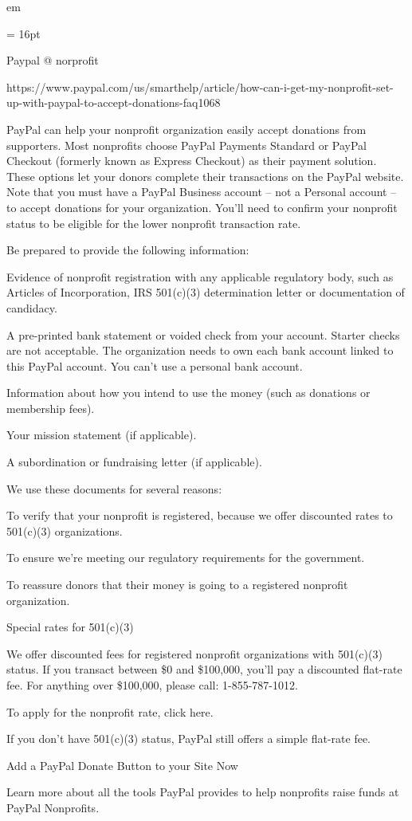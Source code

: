 

 em

\FFrh \baselineskip = 16pt



\centerline{
Paypal @ norprofit
} 
{
https://www.paypal.com/us/smarthelp/article/how-can-i-get-my-nonprofit-set-up-with-paypal-to-accept-donations-faq1068
} 

\par PayPal can help your nonprofit organization easily accept donations from supporters. Most nonprofits choose PayPal Payments Standard or PayPal Checkout (formerly known as Express Checkout) as their payment solution. These options let your donors complete their transactions on the PayPal website. Note that you must have a PayPal Business account – not a Personal account – to accept donations for your organization. You’ll need to confirm your nonprofit status to be eligible for the lower nonprofit transaction rate.
\par Be prepared to provide the following information:
\par Evidence of nonprofit registration with any applicable regulatory body, such as Articles of Incorporation, IRS 501(c)(3) determination letter or documentation of candidacy.
\par A pre-printed bank statement or voided check from your account. Starter checks are not acceptable. The organization needs to own each bank account linked to this PayPal account. You can't use a personal bank account.
\par Information about how you intend to use the money (such as donations or membership fees).
\par Your mission statement (if applicable).
\par A subordination or fundraising letter (if applicable).
\par We use these documents for several reasons:
\par To verify that your nonprofit is registered, because we offer discounted rates to 501(c)(3) organizations.
\par To ensure we’re meeting our regulatory requirements for the government.
\par To reassure donors that their money is going to a registered nonprofit organization.
\par Special rates for 501(c)(3)
\par We offer discounted fees for registered nonprofit organizations with 501(c)(3) status. If you transact between \$0 and \$100,000, you’ll pay a discounted flat-rate fee. For anything over \$100,000, please call: 1-855-787-1012.
\par To apply for the nonprofit rate, click here.
\par If you don’t have 501(c)(3) status, PayPal still offers a simple flat-rate fee.
\par Add a PayPal Donate Button to your Site Now
\par Learn more about all the tools PayPal provides to help nonprofits raise funds at PayPal Nonprofits.

\bye
